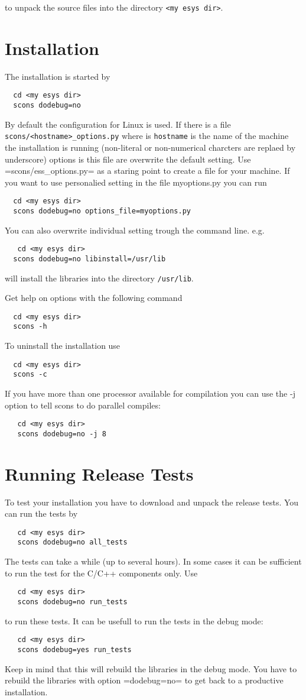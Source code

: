 to unpack the source files into the directory \verb|<my esys dir>|.

\section{Installation}

The installation is started by 
\begin{verbatim}
  cd <my esys dir>
  scons dodebug=no
\end{verbatim}
By default the configuration for Linux is used. If there is a file \verb|scons/<hostname>_options.py| where is \verb|hostname| is the name of the machine the installation is running (non-literal or non-numerical charcters are replaed by underscore)  options is this file are overwrite the default setting. Use =scons/ess_options.py= as a staring point to create a file for your machine. If you want to use personalied setting in the file myoptions.py you can run
\begin{verbatim}
  cd <my esys dir>
  scons dodebug=no options_file=myoptions.py
\end{verbatim}
You can also overwrite individual setting trough the command line. e.g.
\begin{verbatim}
   cd <my esys dir>
  scons dodebug=no libinstall=/usr/lib
\end{verbatim}
will install the libraries into the directory \verb|/usr/lib|. 

Get help on options with the following command
\begin{verbatim}
  cd <my esys dir>
  scons -h
\end{verbatim}
To uninstall the installation use
\begin{verbatim}
  cd <my esys dir>
  scons -c
\end{verbatim}

If you have more than one processor available for compilation you can use the -j option to tell scons to do parallel compiles:
\begin{verbatim}
   cd <my esys dir>
   scons dodebug=no -j 8
\end{verbatim}
\section{Running Release Tests}
To test your installation you have to download and unpack the release tests. You can run the tests by
\begin{verbatim}
   cd <my esys dir>
   scons dodebug=no all_tests
\end{verbatim}
The tests can take a while (up to several hours). In some cases it can be sufficient to run the test for the C/C++ components only. Use  
\begin{verbatim}
   cd <my esys dir>
   scons dodebug=no run_tests
\end{verbatim}
to run these tests.
It can be usefull to run the tests in the debug mode:
\begin{verbatim}
   cd <my esys dir>
   scons dodebug=yes run_tests
\end{verbatim}
Keep in mind that this will rebuild the libraries in the debug mode. You have to rebuild the libraries with option =dodebug=no= to get back to a productive installation.


